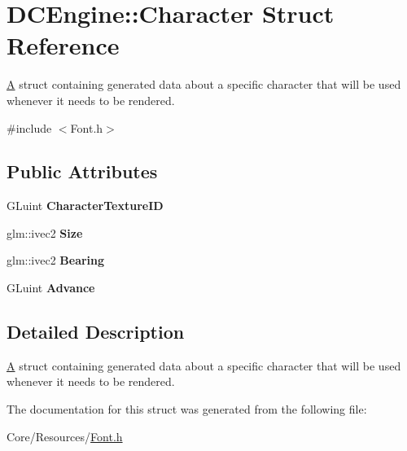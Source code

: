\hypertarget{structDCEngine_1_1Character}{\section{D\-C\-Engine\-:\-:Character Struct Reference}
\label{structDCEngine_1_1Character}
}


\hyperlink{classA}{A} struct containing generated data about a specific character that will be used whenever it needs to be rendered.  




{\ttfamily \#include $<$Font.\-h$>$}

\subsection*{Public Attributes}
\begin{DoxyCompactItemize}
\item 
\hypertarget{structDCEngine_1_1Character_a6ccc6a669e788621f5ce5c17d2cc91d0}{G\-Luint {\bfseries Character\-Texture\-I\-D}}\label{structDCEngine_1_1Character_a6ccc6a669e788621f5ce5c17d2cc91d0}

\item 
\hypertarget{structDCEngine_1_1Character_a6c3888a28620dce20b10d90f8c2463b1}{glm\-::ivec2 {\bfseries Size}}\label{structDCEngine_1_1Character_a6c3888a28620dce20b10d90f8c2463b1}

\item 
\hypertarget{structDCEngine_1_1Character_aef0f74189925807fe180f1aea85aab7e}{glm\-::ivec2 {\bfseries Bearing}}\label{structDCEngine_1_1Character_aef0f74189925807fe180f1aea85aab7e}

\item 
\hypertarget{structDCEngine_1_1Character_a32bba68b7844b8d18d2a7498fe2a8cc2}{G\-Luint {\bfseries Advance}}\label{structDCEngine_1_1Character_a32bba68b7844b8d18d2a7498fe2a8cc2}

\end{DoxyCompactItemize}


\subsection{Detailed Description}
\hyperlink{classA}{A} struct containing generated data about a specific character that will be used whenever it needs to be rendered. 

The documentation for this struct was generated from the following file\-:\begin{DoxyCompactItemize}
\item 
Core/\-Resources/\hyperlink{Font_8h}{Font.\-h}\end{DoxyCompactItemize}
